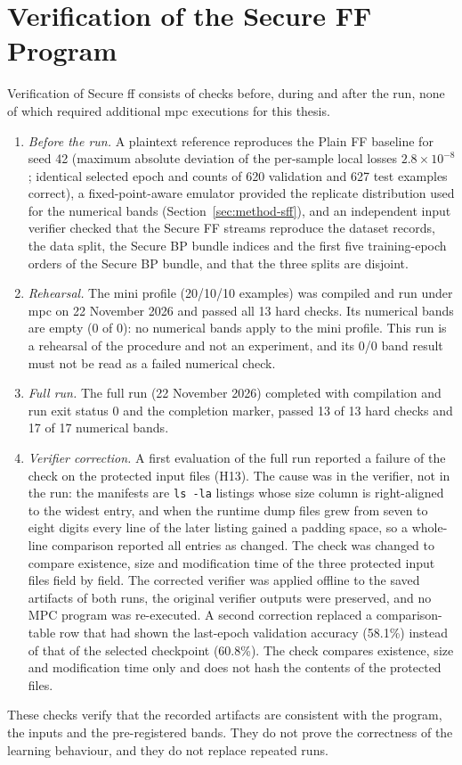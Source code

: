 \section{Verification of the Secure FF Program}\label{sec:impl-sff-verify}
Verification of Secure \ac{ff} consists of checks before, during and after the run, none of which required additional \ac{mpc} executions for this thesis.
\begin{enumerate}
  \item \emph{Before the run.} A plaintext reference reproduces the Plain FF baseline for seed 42 (maximum absolute deviation of the per-sample local losses $2.8\times10^{-8}$; identical selected epoch and counts of 620 validation and 627 test examples correct), a fixed-point-aware emulator provided the replicate distribution used for the numerical bands (Section~\ref{sec:method-sff}), and an independent input verifier checked that the Secure FF streams reproduce the dataset records, the data split, the Secure BP bundle indices and the first five training-epoch orders of the Secure BP bundle, and that the three splits are disjoint.
  \item \emph{Rehearsal.} The mini profile (20/10/10 examples) was compiled and run under \ac{mpc} on 22 November 2026 and passed all 13 hard checks. Its numerical bands are empty (0 of 0): no numerical bands apply to the mini profile. This run is a rehearsal of the procedure and not an experiment, and its 0/0 band result must not be read as a failed numerical check.
  \item \emph{Full run.} The full run (22 November 2026) completed with compilation and run exit status 0 and the completion marker, passed 13 of 13 hard checks and 17 of 17 numerical bands.
  \item \emph{Verifier correction.} A first evaluation of the full run reported a failure of the check on the protected input files (H13). The cause was in the verifier, not in the run: the manifests are \texttt{ls -la} listings whose size column is right-aligned to the widest entry, and when the runtime dump files grew from seven to eight digits every line of the later listing gained a padding space, so a whole-line comparison reported all entries as changed. The check was changed to compare existence, size and modification time of the three protected input files field by field. The corrected verifier was applied offline to the saved artifacts of both runs, the original verifier outputs were preserved, and no MPC program was re-executed. A second correction replaced a comparison-table row that had shown the last-epoch validation accuracy (58.1\%) instead of that of the selected checkpoint (60.8\%). The check compares existence, size and modification time only and does not hash the contents of the protected files.
\end{enumerate}
These checks verify that the recorded artifacts are consistent with the program, the inputs and the pre-registered bands. They do not prove the correctness of the learning behaviour, and they do not replace repeated runs.

